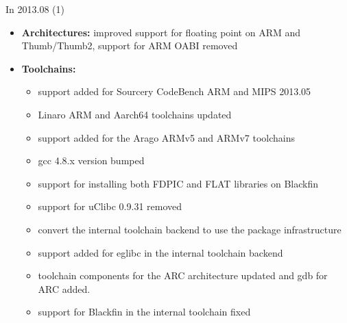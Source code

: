 \begin{frame}{In 2013.08 (1)}
  \begin{itemize}
  \item {\bf Architectures:} improved support for floating point on
    ARM and Thumb/Thumb2, support for ARM OABI removed
  \item {\bf Toolchains:}
    \begin{itemize}
    \item support added for Sourcery CodeBench ARM and MIPS 2013.05
    \item Linaro ARM and Aarch64 toolchains updated
    \item support added for the Arago ARMv5 and ARMv7 toolchains
    \item gcc 4.8.x version bumped
    \item support for installing both FDPIC and FLAT libraries on
      Blackfin
    \item support for uClibc 0.9.31 removed
    \item convert the internal toolchain backend to use the package
      infrastructure
    \item support added for eglibc in the internal toolchain backend
    \item toolchain components for the ARC architecture updated and
      gdb for ARC added.
    \item support for Blackfin in the internal toolchain fixed
    \end{itemize}
  \end{itemize}
\end{frame}

